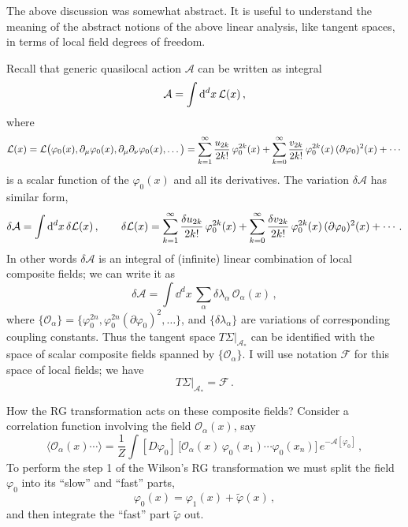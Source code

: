 The above discussion was somewhat abstract. It is useful to understand the
meaning of the abstract notions of the above linear analysis, like tangent
spaces, in terms of local field degrees of freedom.

Recall that generic quasilocal action $\mathcal A$ can be written as integral
\[
\mathcal A=\int \mathop{}\!\mathrm{d}^dx\,\mathcal{L}(x)\,,
\]
where
\[
\mathcal{L}(x)=\mathcal{L}\bigl(\varphi_0(x),\partial_\mu\varphi_0(x),\partial_\mu\partial_\nu\varphi_0(x),\dots\bigr)
=\sum_{k=1}^\infty\frac{u_{2k}}{2k!}\,\varphi_0^{2k}(x)+\sum_{k=0}^\infty\frac{v_{2k}}{2k!}\,\varphi_0^{2k}(x)\,(\partial\varphi_0)^2(x)+\cdots
\]
is a scalar function of the $\varphi_0(x)$ and all its derivatives. The variation
$\delta\mathcal A$ has similar form,
\[
\delta\mathcal A=\int \mathop{}\!\mathrm{d}^dx\,\delta\mathcal{L}(x)\,,\qquad
\delta\mathcal{L}(x)=\sum_{k=1}^\infty\frac{\delta u_{2k}}{2k!}\,\varphi_0^{2k}(x)+\sum_{k=0}^\infty\frac{\delta v_{2k}}{2k!}\,\varphi_0^{2k}(x)\,(\partial\varphi_0)^2(x)+\cdots\,.
\]
In other words $\delta\mathcal A$ is an integral of (infinite) linear combination
of local composite fields; we can write it as
\[
\delta\mathcal A=\int \dd^dx\,\sum_\alpha\delta\lambda_\alpha\,\mathcal O_\alpha(x)\,,
\]
where
$\{\mathcal O_\alpha\}=\{\varphi_0^{2n},\varphi_0^{2n}(\partial\varphi_0)^2,\dots\}$,
and $\{\delta\lambda_\alpha\}$ are variations of corresponding coupling
constants. Thus the tangent space $T\Sigma|_{\mathcal A_*}$ can be identified
with the space of scalar composite fields spanned by $\{\mathcal O_\alpha\}$. I
will use notation $\mathcal F$ for this space of local fields; we have
\[
T\Sigma|_{\mathcal A_*}=\mathcal F\,.
\]

How the RG transformation acts on these composite fields? Consider a correlation
function involving the field $\mathcal O_\alpha(x)$, say
\[
\bigl\langle\mathcal O_\alpha(x)\cdots\bigr\rangle=\frac1Z\int[D\varphi_0]\,\bigl[\mathcal O_\alpha(x)\,\varphi_0(x_1)\cdots\varphi_0(x_n)\bigr]\,e^{-\mathcal A[\varphi_0]}\,,
\]
To perform the step 1 of the Wilson's RG transformation we must split the field
$\varphi_0$ into its ``slow'' and ``fast'' parts,
\[
\varphi_0(x)=\varphi_1(x)+\tilde\varphi(x)\,,
\]
and then integrate the ``fast'' part $\tilde\varphi$ out.

